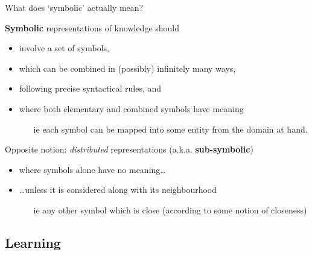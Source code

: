 \documentclass[presentation]{beamer}\mode<presentation>{\usetheme{AMSBolognaFC}}
\begin{document}
\begin{frame}{What does `symbolic' actually mean?}
    \begin{block}{\textbf{Symbolic} representations of knowledge should}
        \begin{itemize}
            \item involve a \alert{set of symbols},
            \item which can be combined in (possibly) \alert{infinitely many} ways, 
            \item following precise \alert{syntactical} rules, and
            \item where both elementary and combined symbols have \alert{meaning}
            \begin{itemize}
                \item[ie] \alert{each} symbol can be mapped into some entity from the domain at hand.
            \end{itemize}
        \end{itemize}
    \end{block}

    \begin{alertblock}{Opposite notion: \textit{distributed} representations (a.k.a. \textbf{sub-symbolic})}
        \begin{itemize}
            \item where symbols \alert{alone} have no meaning\ldots
            \item \ldots unless it is considered along with its \alert{neighbourhood}
            \begin{itemize}
                \item[ie] any other symbol which is \alert{close} (according to some notion of closeness)
            \end{itemize}
        \end{itemize}
    \end{alertblock}
\end{frame}

\subsection{Learning}
\end{document}
